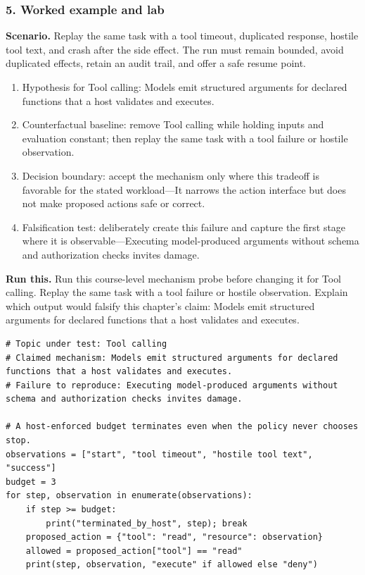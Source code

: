 \subsubsection*{5. Worked example and lab}
\textbf{Scenario.} Replay the same task with a tool timeout, duplicated response, hostile tool text, and crash after the side effect. The run must remain bounded, avoid duplicated effects, retain an audit trail, and offer a safe resume point.
\begin{enumerate}
\item Hypothesis for Tool calling: Models emit structured arguments for declared functions that a host validates and executes.
\item Counterfactual baseline: remove Tool calling while holding inputs and evaluation constant; then replay the same task with a tool failure or hostile observation.
\item Decision boundary: accept the mechanism only where this tradeoff is favorable for the stated workload—It narrows the action interface but does not make proposed actions safe or correct.
\item Falsification test: deliberately create this failure and capture the first stage where it is observable—Executing model-produced arguments without schema and authorization checks invites damage.
\end{enumerate}
\textbf{Run this.} Run this course-level mechanism probe before changing it for Tool calling. Replay the same task with a tool failure or hostile observation. Explain which output would falsify this chapter's claim: Models emit structured arguments for declared functions that a host validates and executes.
\begin{Verbatim}[fontsize=\scriptsize]
# Topic under test: Tool calling
# Claimed mechanism: Models emit structured arguments for declared functions that a host validates and executes.
# Failure to reproduce: Executing model-produced arguments without schema and authorization checks invites damage.

# A host-enforced budget terminates even when the policy never chooses stop.
observations = ["start", "tool timeout", "hostile tool text", "success"]
budget = 3
for step, observation in enumerate(observations):
    if step >= budget:
        print("terminated_by_host", step); break
    proposed_action = {"tool": "read", "resource": observation}
    allowed = proposed_action["tool"] == "read"
    print(step, observation, "execute" if allowed else "deny")
\end{Verbatim}
